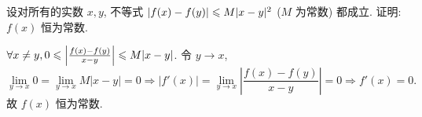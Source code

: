\begin{exercise}[3.3.12]
    设对所有的实数 $x,y$, 不等式 $|f(x)-f(y)| \leqslant M|x-y|^2$ ($M$ 为常数) 都成立. 证明: $f(x)$ 恒为常数.
\end{exercise}

\begin{solution}
    $\forall x \ne y, 0 \leqslant \left|\frac{f(x)-f(y)}{x-y}\right| \leqslant M|x-y|$. 令 $y \to x$,
    $$ \lim_{y\to x} 0 = \lim_{y\to x} M|x-y| = 0 \Rightarrow |f'(x)| = \lim_{y\to x} \left|\frac{f(x) - f(y)}{x-y}\right| = 0 \Rightarrow f'(x) = 0. $$
    故 $f(x)$ 恒为常数.
\end{solution}







